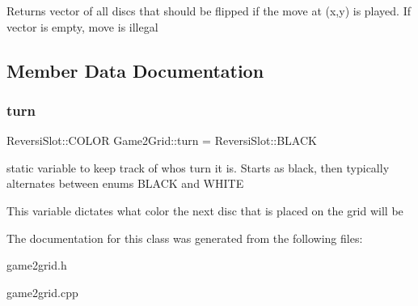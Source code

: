 \begin{DoxyReturn}{Returns}
vector of all discs that should be flipped if the move at (x,y) is played. If vector is empty, move is illegal 
\end{DoxyReturn}


\subsection{Member Data Documentation}
\mbox{\label{classGame2Grid_a1b09031451ce6d9644e40d7e7a36697e}} 
\subsubsection{\texorpdfstring{turn}{turn}}
{\footnotesize\ttfamily Reversi\+Slot\+::\+C\+O\+L\+OR Game2\+Grid\+::turn = Reversi\+Slot\+::\+B\+L\+A\+CK\hspace{0.3cm}{\ttfamily [static]}}



static variable to keep track of who\textquotesingle{}s turn it is. Starts as black, then typically alternates between enums B\+L\+A\+CK and W\+H\+I\+TE 

This variable dictates what color the next disc that is placed on the grid will be 

The documentation for this class was generated from the following files\+:\begin{DoxyCompactItemize}
\item 
game2grid.\+h\item 
game2grid.\+cpp\end{DoxyCompactItemize}
